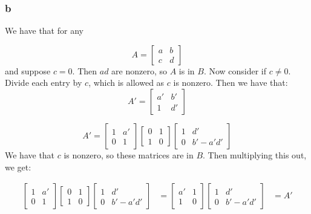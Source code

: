 \documentclass[]{article}
\begin{document}
\subsubsection*{b}
We have that for any 

\begin{equation}
	A = \begin{bmatrix}
		a & b\\
		c & d
	\end{bmatrix}
\end{equation}
and suppose $c = 0$. Then $a d$ are nonzero, so $A$ is in $B$. Now consider if $c \neq 0$. Divide each entry by $c$, which is allowed as $c$ is nonzero. Then we have that:
\begin{equation}
	A' = \begin{bmatrix}
		a' & b'\\
		1 & d'
	\end{bmatrix}
\end{equation}

\begin{equation}
	A' = 
	\begin{bmatrix}
		1 & a'\\
		0 & 1
	\end{bmatrix}
	\begin{bmatrix}
		0 & 1\\
		1 & 0
	\end{bmatrix}
	\begin{bmatrix}
		1 & d'\\
		0 & b' - a'd'
	\end{bmatrix}
\end{equation}
We have that $c$ is nonzero, so these matrices are in $B$. Then multiplying this out, we get:

\begin{align*}
		\begin{bmatrix}
		1 & a'\\
		0 & 1
	\end{bmatrix}
	\begin{bmatrix}
		0 & 1\\
		1 & 0
	\end{bmatrix}
	\begin{bmatrix}
		1 & d'\\
		0 & b' - a'd'
	\end{bmatrix}
&=
	\begin{bmatrix}
	a' & 1\\
	1 & 0
\end{bmatrix}
\begin{bmatrix}
	1 & d'\\
	0 & b' - a'd'
\end{bmatrix}
&= A'
\end{align*}
\end{document}
